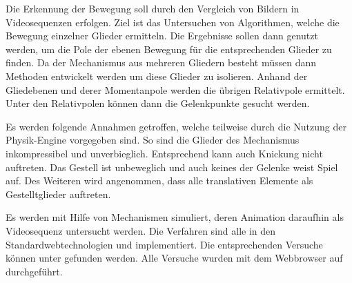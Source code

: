 Die Erkennung der Bewegung soll durch den Vergleich von Bildern in Videosequenzen erfolgen.
Ziel ist das Untersuchen von Algorithmen, welche die Bewegung einzelner Glieder ermitteln.
Die Ergebnisse sollen dann genutzt werden, um die Pole der ebenen Bewegung für die entsprechenden Glieder zu finden.
Da der Mechanismus aus mehreren Gliedern besteht müssen dann Methoden entwickelt werden um diese Glieder zu isolieren.
Anhand der Gliedebenen und derer Momentanpole werden die übrigen Relativpole ermittelt.
Unter den Relativpolen können dann die Gelenkpunkte gesucht werden.

Es werden folgende Annahmen getroffen, welche teilweise durch die Nutzung der Physik-Engine  vorgegeben sind.
So sind die Glieder des Mechanismus inkompressibel und unverbieglich.
Entsprechend kann auch Knickung nicht auftreten.
Das Gestell ist unbeweglich und auch keines der Gelenke weist Spiel auf.
Des Weiteren wird angenommen, dass alle translativen Elemente als Gestelltglieder auftreten.

Es werden mit Hilfe von  Mechanismen simuliert, deren Animation daraufhin als Videosequenz untersucht werden.
Die Verfahren sind alle in den Standardwebtechnologien  und  implementiert.
Die entsprechenden Versuche können unter  gefunden werden.
Alle Versuche wurden mit dem Webbrowser  auf  durchgeführt.
